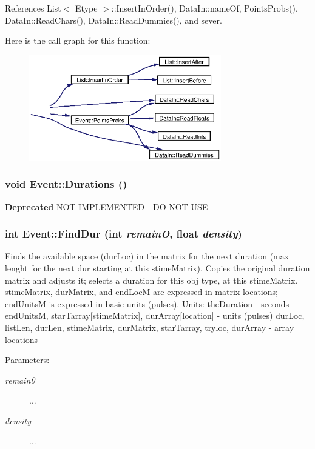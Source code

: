 References List$<$ Etype $>$::Insert\-In\-Order(), Data\-In::name\-Of, Points\-Probs(), Data\-In::Read\-Chars(), Data\-In::Read\-Dummies(), and sever.

Here is the call graph for this function:\begin{figure}[H]
\begin{center}
\leavevmode
\includegraphics[width=237pt]{classEvent_a35_cgraph}
\end{center}
\end{figure}
\subsubsection{\setlength{\rightskip}{0pt plus 5cm}void Event::Durations ()}\label{classEvent_a43}


\begin{Desc}
\item[{\bf Deprecated}]NOT IMPLEMENTED - DO NOT USE \end{Desc}
\subsubsection{\setlength{\rightskip}{0pt plus 5cm}int Event::Find\-Dur (int {\em remain\-O}, float {\em density})}\label{classEvent_a55}


Finds the available space (dur\-Loc) in the matrix for the next duration (max lenght for the next dur starting at this stime\-Matrix). Copies the original duration matrix and adjusts it; selects a duration for this obj type, at this stime\-Matrix. stime\-Matrix, dur\-Matrix, and end\-Loc\-M are expressed in matrix locations; end\-Units\-M is expressed in basic units (pulses). Units: the\-Duration - seconds end\-Units\-M, star\-Tarray[stime\-Matrix], dur\-Array[location] - units (pulses) dur\-Loc, list\-Len, dur\-Len, stime\-Matrix, dur\-Matrix, star\-Tarray, tryloc, dur\-Array - array locations \begin{Desc}
\item[Parameters:]
\begin{description}
\item[{\em remain0}]... \item[{\em density}]... \end{description}
\end{Desc}


